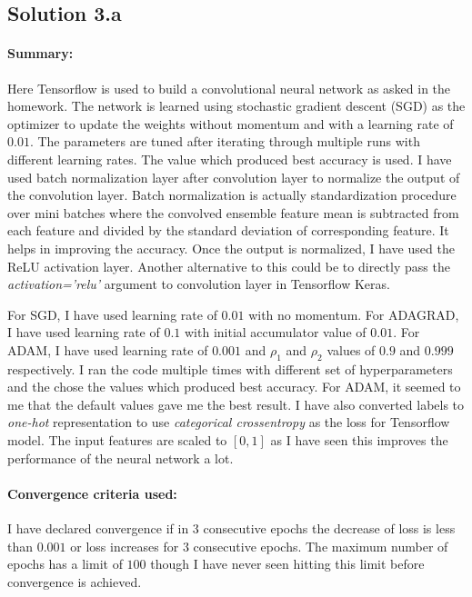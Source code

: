 \subsection*{Solution 3.a}
\paragraph{Summary:} Here Tensorflow is used to build a convolutional neural network as asked in the homework. The network is learned using stochastic gradient descent (SGD) as the optimizer to update the weights without momentum and with a learning rate of $0.01$. The parameters are tuned after iterating through multiple runs with different learning rates. The value which produced best accuracy is used. I have used batch normalization layer after convolution layer to normalize the output of the convolution layer. Batch normalization is actually standardization procedure over mini batches where the convolved ensemble feature mean is subtracted from each feature and divided by the standard deviation of corresponding feature. It helps in improving the accuracy. Once the output is normalized, I have used the ReLU activation layer. Another alternative to this could be to directly pass the \textit{activation='relu'} argument to convolution layer in Tensorflow Keras.

For SGD, I have used learning rate of $0.01$ with no momentum. For ADAGRAD, I have used learning rate of $0.1$ with initial accumulator value of $0.01$. For ADAM, I have used learning rate of $0.001$ and $\rho_1$ and $\rho_2$ values of $0.9$ and $0.999$ respectively. I ran the code multiple times with different set of hyperparameters and the chose the values which produced best accuracy. For ADAM, it seemed to me that the default values gave me the best result. I have also converted labels to \textit{one-hot} representation to use \textit{categorical crossentropy} as the loss for Tensorflow model. The input features are scaled to $[0, 1]$ as I have seen this improves the performance of the neural network a lot.
\paragraph{Convergence criteria used:} I have declared convergence if in $3$ consecutive epochs the decrease of loss is less than $0.001$ or loss increases for $3$ consecutive epochs. The maximum number of epochs has a limit of $100$ though I have never seen hitting this limit before convergence is achieved.
